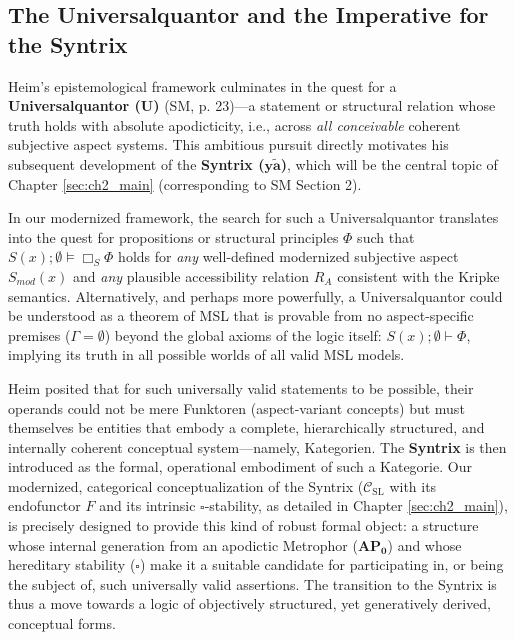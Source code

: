 \documentclass[
    12pt,              %
    a4paper,           %
    headings=normal,   %
    twoside=true,      %
    BCOR=8mm,          %
]{scrbook}
\newcommand{\syntrix}{\bm{y\widetilde{a}}}
\newcommand{\universalquantor}{\bm{U}}
\newcommand{\BoxS}{\Box_S}
\newcommand{\BoxSyn}{\square}
\newcommand{\APZero}{\mathbf{AP_0}}
\begin{document}
\subsection{The Universalquantor and the Imperative for the Syntrix}
\label{sec:ch1_universalquantor_motivation_syntrix} 

Heim's epistemological framework culminates in the quest for a \textbf{Universalquantor (\(\universalquantor\))} (SM, p. 23)—a statement or structural relation whose truth holds with absolute apodicticity, i.e., across \textit{all conceivable} coherent subjective aspect systems. This ambitious pursuit directly motivates his subsequent development of the \textbf{Syntrix (\(\syntrix\))}, which will be the central topic of Chapter \ref{sec:ch2_main} (corresponding to SM Section 2).

In our modernized framework, the search for such a Universalquantor translates into the quest for propositions or structural principles \(\Phi\) such that \(S(x); \emptyset \vDash \BoxS \Phi\) holds for \textit{any} well-defined modernized subjective aspect \(S_{mod}(x)\) and \textit{any} plausible accessibility relation \(R_A\) consistent with the Kripke semantics. Alternatively, and perhaps more powerfully, a Universalquantor could be understood as a theorem of MSL that is provable from no aspect-specific premises (\(\Gamma = \emptyset\)) beyond the global axioms of the logic itself: \(S(x); \emptyset \vdash \Phi\), implying its truth in all possible worlds of all valid MSL models.

Heim posited that for such universally valid statements to be possible, their operands could not be mere Funktoren (aspect-variant concepts) but must themselves be entities that embody a complete, hierarchically structured, and internally coherent conceptual system—namely, Kategorien. The \textbf{Syntrix} is then introduced as the formal, operational embodiment of such a Kategorie. Our modernized, categorical conceptualization of the Syntrix (\(\mathcal{C}_{\text{SL}}\) with its endofunctor \(F\) and its intrinsic \(\BoxSyn\)-stability, as detailed in Chapter \ref{sec:ch2_main}), is precisely designed to provide this kind of robust formal object: a structure whose internal generation from an apodictic Metrophor (\(\APZero\)) and whose hereditary stability (\(\BoxSyn\)) make it a suitable candidate for participating in, or being the subject of, such universally valid assertions. The transition to the Syntrix is thus a move towards a logic of objectively structured, yet generatively derived, conceptual forms.
\end{document}
